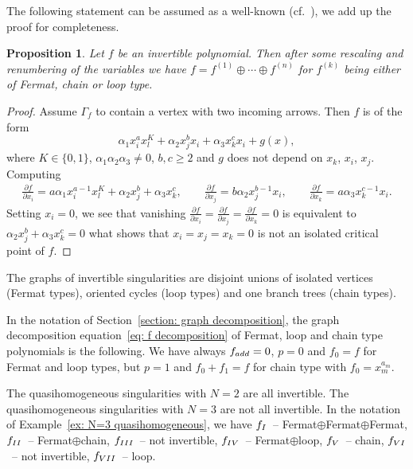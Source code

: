 \documentclass[10pt,a4paper]{article}
\numberwithin{equation}{section}
\newtheorem{Proposition}[Theorem]{Proposition}
 { \theoremstyle{definition}
\newtheorem{Definition}[Theorem]{Definition}
\newtheorem{Note}[Theorem]{Note}
\newtheorem{Example}[Theorem]{Example}
\newtheorem{Remark}[Theorem]{Remark} }
\def\p{\partial }
\begin{document}
The following statement can be assumed as a well-known (cf.~\cite{KS}), we add up the proof for completeness.
\begin{Proposition}\label{prop: invertible polynomial classification}
	Let $f$ be an invertible polynomial. Then after some rescaling and renumbering of the variables we have $f = f^{(1)} \oplus \cdots \oplus f^{(n)}$ for $f^{(k)}$ being either of Fermat, chain or loop type.
\end{Proposition}
\begin{proof}
Assume $\Gamma_f$ to contain a vertex with two incoming arrows. Then $f$ is of the form
\[
	\alpha_1 x_i^a x_l^K + \alpha_2 x_j^bx_i + \alpha_3 x_k^cx_i + g(x),
\]
where $K \in \{ 0,1\}$, $\alpha_1\alpha_2\alpha_3 \neq 0$, $b,c \ge 2$ and $g$ does not depend on $x_k$, $x_i$, $x_j$. Computing
\begin{align*}
	\frac{\p f}{\p x_i}  = a \alpha_1 x_i^{a-1} x_l^K + \alpha_2 x_j^b + \alpha_3 x_k^c,
	\qquad
	\frac{\p f}{\p x_j}  = b \alpha_2 x_j^{b-1}x_i,
	\qquad
	\frac{\p f}{\p x_k} = a \alpha_3 x_k^{c-1}x_i.
\end{align*}
Setting $x_i = 0$, we see that vanishing $\frac{\p f}{\p x_i} = \frac{\p f}{\p x_j} =\frac{\p f}{\p x_k} =0$ is equivalent to $\alpha_2 x_j^b + \alpha_3 x_k^c = 0$ what shows that $x_i=x_j=x_k=0$ is not an isolated critical point of $f$.
\end{proof}

The graphs of invertible singularities are disjoint unions of isolated vertices (Fermat types), oriented cycles (loop types) and one branch trees (chain types).

In the notation of Section~\ref{section: graph decomposition}, the graph decomposition equation~\eqref{eq: f decomposition} of Fermat, loop and chain type polynomials is the following. We have always $f_{\rm add} = 0$, $p=0$ and $f_0 = f$ for Fermat and loop types, but $p=1$ and $f_0 + f_1 = f$ for chain type with $f_0 = x_m^{a_m}$.

\begin{Example}
 The quasihomogeneous singularities with $N=2$ are all invertible.
	The quasihomogeneous singularities with $N=3$ are not all invertible. In the notation of Example~\ref{ex: N=3 quasihomogeneous}, we have $f_{\rm I}$~-- Fermat$\oplus$Fermat$\oplus$Fermat, $f_{\rm II}$~-- Fermat$\oplus$chain, $f_{\rm III}$~-- not invertible, $f_{\rm IV} $~-- Fermat$\oplus$loop,
	$f_{\rm V}$~-- chain, $f_{\rm VI}$~-- not invertible, $f_{\rm VII}$~-- loop.
\end{Example}
\end{document}
